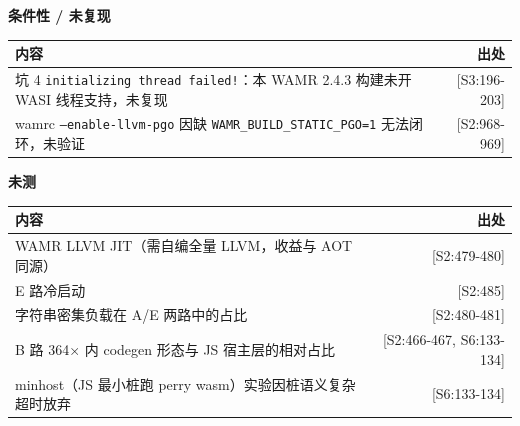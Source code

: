 \documentclass[11pt, a4paper]{article}
\begin{document}
\textbf{条件性 / 未复现}


\begin{center}\small\begin{tabular}{lr}
\toprule
内容 & 出处 \\
\midrule
坑 4 \texttt{initializing thread failed!}：本 WAMR 2.4.3 构建未开 WASI 线程支持，未复现 & [S3:196-203] \\
wamrc \texttt{--enable-llvm-pgo} 因缺 \texttt{WAMR\_BUILD\_STATIC\_PGO=1} 无法闭环，未验证 & [S2:968-969] \\
\bottomrule
\end{tabular}\end{center}


\textbf{未测}


\begin{center}\small\begin{tabular}{lr}
\toprule
内容 & 出处 \\
\midrule
WAMR LLVM JIT（需自编全量 LLVM，收益与 AOT 同源） & [S2:479-480] \\
E 路冷启动 & [S2:485] \\
字符串密集负载在 A/E 两路中的占比 & [S2:480-481] \\
B 路 364× 内 codegen 形态与 JS 宿主层的相对占比 & [S2:466-467, S6:133-134] \\
minhost（JS 最小桩跑 perry wasm）实验因桩语义复杂超时放弃 & [S6:133-134] \\
\bottomrule
\end{tabular}\end{center}
\end{document}
